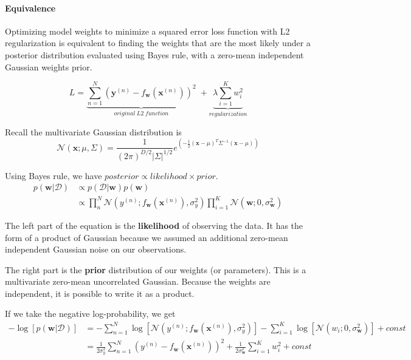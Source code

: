 \paragraph{Equivalence}
Optimizing model weights to minimize a squared error loss function with L2 regularization is equivalent to finding the weights that are the most likely under a posterior distribution evaluated using Bayes rule, with a zero-mean independent Gaussian weights prior.

\begin{equation}
L = \underbrace{\sum_{n=1}^N (\mathbf{y}^{(n)}-f_\mathbf{w}(\mathbf{x}^{(n)}))^2}_{original\;L2\;function} \;+ \underbrace{\lambda \sum_{i=1}^{K} w_i^2}_{regularization}
\end{equation}

Recall the multivariate Gaussian distribution is
\begin{equation}
    \mathcal{N}(\mathbf{x}; \mu, \Sigma) = \frac{1}{(2\pi)^{D/2} |\Sigma|^{1/2}} e^{\left(-\frac{1}{2} (\mathbf{x}-\mu)^T \Sigma^{-1}(\mathbf{x}-\mu)\right)}
\end{equation}

Using Bayes rule, we have $posterior \propto likelihood \times prior$.
\begin{align}
    p(\mathbf{w}|\mathcal{D}) & \propto p(\mathcal{D}|\mathbf{w}) p(\mathbf{w}) \\
     & \propto \prod_n^N \mathcal{N}(y^{(n)}; f_\mathbf{w}(\mathbf{x}^{(n)}), \sigma_y^2) \prod_{i=1}^K \mathcal{N}(\mathbf{w}; 0, \sigma_\mathbf{w}^2)
\end{align}

The left part of the equation is the \textbf{likelihood} of observing the data. It has the form of a product of Gaussian because we assumed an additional zero-mean independent Gaussian noise on our observations.

The right part is the \textbf{prior} distribution of our weights (or parameters). This is a multivariate zero-mean uncorrelated Gaussian. Because the weights are independent, it is possible to write it as a product.

If we take the negative log-probability, we get
\begin{align}
    -\log[p(\mathbf{w}|\mathcal{D})] & = -\sum_ {n=1}^{N} \log[\mathcal{N}(y^{(n)}; f_{\mathbf{w}}(\mathbf{x}^{(n)}), \sigma_y^2)] - \sum_{i=1}^K \log[\mathcal{N}(w_i; 0, \sigma_{\mathbf{w}}^2)] + const \\
    & = \frac{1}{2\sigma_y^2} \sum_{n=1}^N (y^{(n)} - f_{\mathbf{w}}(\mathbf{x}^{(n)}))^2 + \frac{1}{2\sigma_{\mathbf{w}}^2} \sum_{i=1}^K w_i^2 + const
\end{align}

